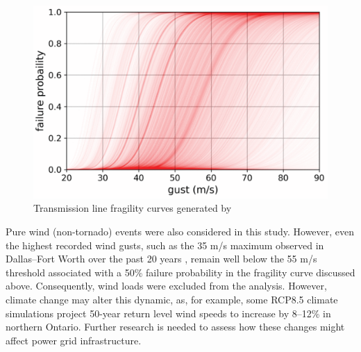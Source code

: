 \documentclass[12pt]{article}
\begin{document}
\begin{figure}[ht]
    \centering %
    \includegraphics[width=\textwidth]{TLfragility.pdf}
    \caption[Transmission line fragility curves]{Transmission line fragility curves generated by \cite{Watson2024}}
    \label{fig:TLfragility}
\end{figure}
Pure wind (non-tornado) events were also considered in this study. However, even the highest recorded wind gusts, such as the 35 m/s maximum observed in Dallas–Fort Worth over the past 20 years \cite{NWS}, remain well below the 55 m/s threshold associated with a 50\% failure probability in the fragility curve discussed above. Consequently, wind loads were excluded from the analysis. However, climate change may alter this dynamic, as, for example, some RCP8.5 climate simulations project 50-year return level wind speeds to increase by 8–12\% in northern Ontario. Further research is needed to assess how these changes might affect power grid infrastructure. \par
\end{document}
